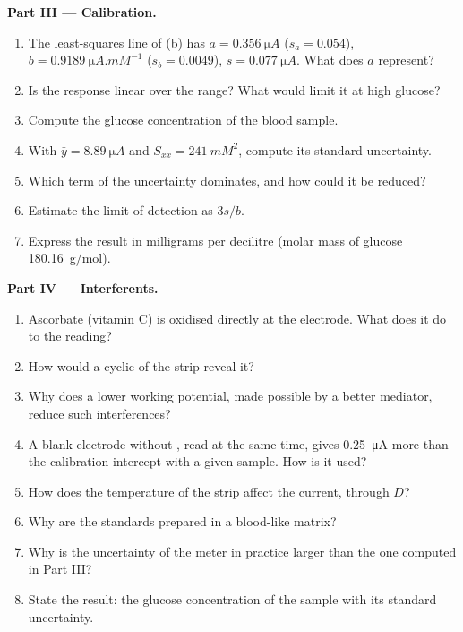 \begin{problem}
\medskip\noindent\textbf{Part III --- Calibration.}
\begin{enumerate}[resume]
  \item The least-squares line of (b) has $a = \qty{0.356}{\micro A}$ ($s_a = 0.054$), $b =
        \qty{0.9189}{\micro A.mM^{-1}}$ ($s_b = 0.0049$), $s = \qty{0.077}{\micro A}$. What does $a$ represent?
  \item Is the response linear over the range? What would limit it at high
        glucose?
  \item Compute the glucose concentration of the blood sample.
  \item With $\bar y = \qty{8.89}{\micro A}$ and $S_{xx} = \qty{241}{mM^2}$, compute its standard uncertainty.
  \item Which term of the uncertainty dominates, and how could it be reduced?
  \item Estimate the limit of detection as $3s/b$.
  \item Express the result in milligrams per decilitre (molar mass of glucose
        \qty{180.16}{g/mol}).
\end{enumerate}

\medskip\noindent\textbf{Part IV --- Interferents.}
\begin{enumerate}[resume]
  \item Ascorbate (vitamin C) is oxidised directly at the electrode. What does it
        do to the reading?
  \item How would a cyclic  of the strip reveal it?
  \item Why does a lower working potential, made possible by a better mediator,
        reduce such interferences?
  \item A blank electrode without , read at the same time, gives
        \qty{0.25}{\micro A} more than the calibration intercept with a given sample. How
        is it used?
  \item How does the temperature of the strip affect the current, through $D$?
  \item Why are the standards prepared in a blood-like matrix?
  \item Why is the uncertainty of the meter in practice larger than the one
        computed in Part III?
  \item State the result: the glucose concentration of the sample with its
        standard uncertainty.
\end{enumerate}
\end{problem}
